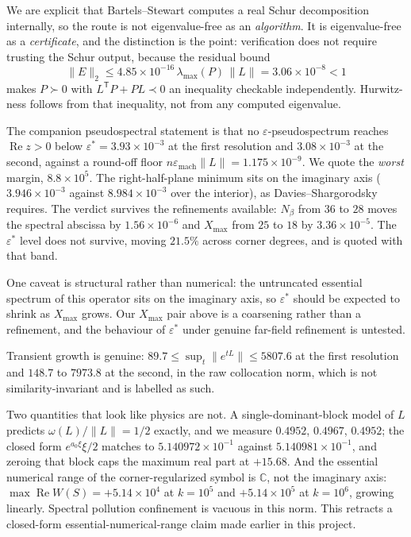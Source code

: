 \documentclass[11pt]{article}
\newcommand{\Xmax}{X_{\max}}
\begin{document}
We are explicit that Bartels--Stewart computes a real Schur decomposition internally, so
the route is not eigenvalue-free as an \emph{algorithm}. It is eigenvalue-free as a
\emph{certificate}, and the distinction is the point: verification does not require
trusting the Schur output, because the residual bound
\[
  \|E\|_2 \le 4.85\times10^{-16}\,\lambda_{\max}(P)\,\|L\| = 3.06\times10^{-8} < 1
\]
makes $P \succ 0$ with $L^{\mathsf T}P + PL \prec 0$ an inequality checkable
independently. Hurwitz-ness follows from that inequality, not from any computed
eigenvalue.

The companion pseudospectral statement is that no $\varepsilon$-pseudospectrum reaches
$\operatorname{Re}z > 0$ below $\varepsilon^* = 3.93\times10^{-3}$ at the first
resolution and $3.08\times10^{-3}$ at the second, against a round-off floor
$n\varepsilon_{\mathrm{mach}}\|L\| = 1.175\times10^{-9}$. We quote the \emph{worst}
margin, $8.8\times10^{5}$. The right-half-plane minimum sits on the imaginary axis
($3.946\times10^{-3}$ against $8.984\times10^{-3}$ over the interior), as
Davies--Shargorodsky requires. The verdict survives the refinements available: $N_\beta$
from $36$ to $28$ moves the spectral abscissa by $1.56\times10^{-6}$ and $\Xmax$ from
$25$ to $18$ by $3.36\times10^{-5}$. The $\varepsilon^*$ level does not survive, moving
$21.5\%$ across corner degrees, and is quoted with that band.

One caveat is structural rather than numerical: the untruncated essential spectrum of
this operator sits on the imaginary axis, so $\varepsilon^*$ should be expected to shrink
as $\Xmax$ grows. Our $\Xmax$ pair above is a coarsening rather than a refinement, and
the behaviour of $\varepsilon^*$ under genuine far-field refinement is untested.

Transient growth is genuine: $89.7 \le \sup_t \|e^{tL}\| \le 5807.6$ at the first
resolution and $148.7$ to $7973.8$ at the second, in the raw collocation norm, which is
not similarity-invariant and is labelled as such.

Two quantities that look like physics are not. A single-dominant-block model of $L$
predicts $\omega(L)/\|L\| = 1/2$ exactly, and we measure $0.4952$, $0.4967$, $0.4952$;
the closed form $e^{a_0\xi}\xi/2$ matches to $5.140972\times10^{-1}$ against
$5.140981\times10^{-1}$, and zeroing that block caps the maximum real part at $+15.68$.
And the essential numerical range of the corner-regularized symbol is $\mathbb{C}$, not
the imaginary axis: $\max\operatorname{Re}W(S) = +5.14\times10^{4}$ at $k = 10^5$ and
$+5.14\times10^{5}$ at $k = 10^6$, growing linearly. Spectral pollution confinement is
vacuous in this norm. This retracts a closed-form essential-numerical-range claim made
earlier in this project.
\end{document}
